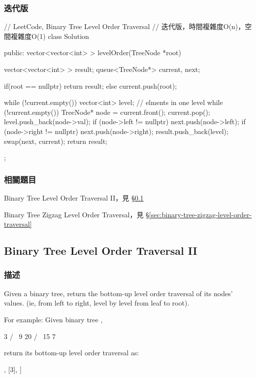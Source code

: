 \subsubsection{迭代版}
\begin{Code}
// LeetCode, Binary Tree Level Order Traversal
// 迭代版，時間複雜度O(n)，空間複雜度O(1)
class Solution {
public:
    vector<vector<int> > levelOrder(TreeNode *root) {
        vector<vector<int> > result;
        queue<TreeNode*> current, next;
        
        if(root == nullptr) {
            return result;
        } else {
            current.push(root);
        }

        while (!current.empty()) {
            vector<int> level; // elments in one level
            while (!current.empty()) {
                TreeNode* node = current.front();
                current.pop();
                level.push_back(node->val);
                if (node->left != nullptr) next.push(node->left);
                if (node->right != nullptr) next.push(node->right);
            }
            result.push_back(level);
            swap(next, current);
        }
        return result;
    }
};
\end{Code}


\subsubsection{相關題目}
\begindot
\item Binary Tree Level Order Traversal II，見 \S \ref{sec:binary-tree-level-order-traversal-ii}
\item Binary Tree Zigzag Level Order Traversal，見 \S \ref{sec:binary-tree-zigzag-level-order-traversal}
\myenddot


\subsection{Binary Tree Level Order Traversal II}
\label{sec:binary-tree-level-order-traversal-ii}


\subsubsection{描述}
Given a binary tree, return the bottom-up level order traversal of its nodes' values. (ie, from left to right, level by level from leaf to root).

For example:
Given binary tree ,
\begin{Code}
    3
   / \
  9  20
    /  \
   15   7
\end{Code}
return its bottom-up level order traversal as:
\begin{Code}
[
  [15,7]
  [9,20],
  [3],
]
\end{Code}


